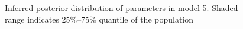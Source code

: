 \begin{figure}[ht]
    \begin{center}
    \end{center}

    \caption[Inferred posterior distribution of parameters in model 5]%
    {Inferred posterior distribution of parameters in model 5. Shaded range indicates 25\%--75\% quantile of the population}
    \label{fig:model5_para}

\end{figure}

